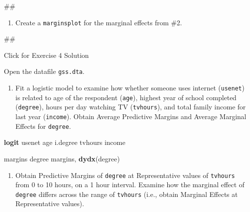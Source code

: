 \documentclass[
]{book}
\newenvironment{Shaded}{\begin{snugshade}}{\end{snugshade}}
\newcommand{\KeywordTok}[1]{\textcolor[rgb]{0.13,0.29,0.53}{\textbf{#1}}}
\newcommand{\NormalTok}[1]{#1}
\providecommand{\tightlist}{%
  \setlength{\itemsep}{0pt}\setlength{\parskip}{0pt}}
\begin{document}
\begin{Shaded}
\begin{Highlighting}[]
\NormalTok{\#\#}
\end{Highlighting}
\end{Shaded}

\begin{enumerate}
\def\labelenumi{\arabic{enumi}.}
\setcounter{enumi}{2}
\tightlist
\item
  Create a \texttt{marginsplot} for the marginal effects from \#2.
\end{enumerate}

\begin{Shaded}
\begin{Highlighting}[]
\NormalTok{\#\#}
\end{Highlighting}
\end{Shaded}

{Click for Exercise 4 Solution}

Open the datafile \texttt{gss.dta}.

\begin{enumerate}
\def\labelenumi{\arabic{enumi}.}
\tightlist
\item
  Fit a logistic model to examine how whether someone uses internet (\texttt{usenet}) is related to age of the respondent (\texttt{age}), highest year of school completed (\texttt{degree}), hours per day watching TV (\texttt{tvhours}), and total family income for last year (\texttt{income}). Obtain Average Predictive Margins and Average Marginal Effects for \texttt{degree}.
\end{enumerate}

\begin{Shaded}
\begin{Highlighting}[]
\KeywordTok{logit}\NormalTok{ usenet age i.degree tvhours income }

\NormalTok{margins degree}
\NormalTok{margins, }\KeywordTok{dydx}\NormalTok{(degree)}
\end{Highlighting}
\end{Shaded}

\begin{enumerate}
\def\labelenumi{\arabic{enumi}.}
\setcounter{enumi}{1}
\tightlist
\item
  Obtain Predictive Margins of \texttt{degree} at Representative values of \texttt{tvhours} from 0 to 10 hours, on a 1 hour interval. Examine how the marginal effect of \texttt{degree} differs across the range of \texttt{tvhours} (i.e., obtain Marginal Effects at Representative values).
\end{enumerate}
\end{document}
